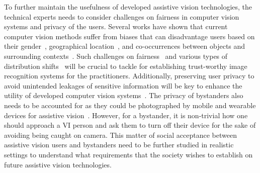 
To further maintain the usefulness of developed assistive vision technologies, the technical experts needs to consider challenges on fairness in computer vision systems and privacy of the users. Several works have shown that current computer vision methods suffer from biases that can disadvantage users based on their gender~\cite{bolukbasi2016man, buolamwini2018gender, burns2018women}, geographical location~\cite{de2019does}, and co-occurrences between objects and surrounding contexts~\cite{singh2020don}. 
Such challenges on fairness~\cite{barocas2019fairml, holstein2019improving, yang2020towards} %
and various types of distribution shifts~\cite{wiles2021fine} %
will be crucial to tackle for establishing trust-worthy image recognition systems for the practitioners.
Additionally, preserving user privacy to avoid unintended leakages of sensitive information will be key to enhance the utility of developed computer vision systems~\cite{ahmed2015privacy, gurari2019vizwiz}. The privacy of bystanders also needs to be accounted for as they could be photographed by mobile and wearable devices for assistive vision~\cite{lee2020pedestrian, ahmed2018up}. However, for a bystander, it is non-trivial how one should approach a VI person and ask them to turn off their device for the sake of avoiding being caught on camera. 
This matter of social acceptance between assistive vision users and bystanders need to be further studied in realistic settings to understand what requirements that the society wishes to establish on future assistive vision technologies.  



